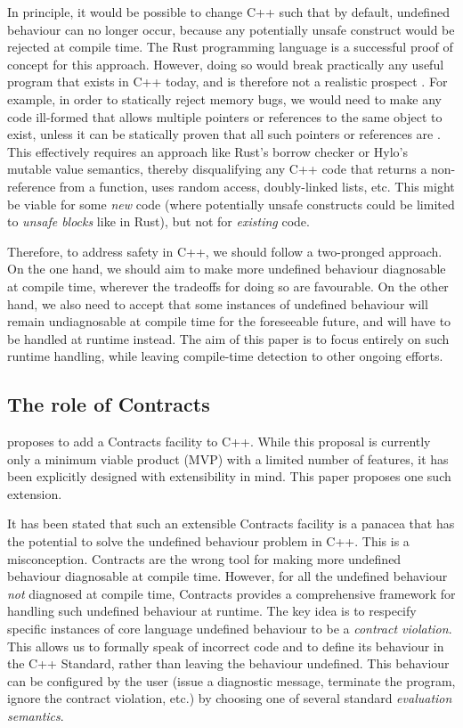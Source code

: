 In principle, it would be possible to change C++ such that by default, undefined behaviour can no longer occur, because any  potentially unsafe construct would be rejected at compile time. The Rust programming language is a successful proof of concept for this approach. However, doing so would break practically any useful program that exists in C++ today, and is therefore not a realistic prospect \cite{Doumler2023}. For example, in order to statically reject memory bugs, we would need to make any code ill-formed that allows multiple pointers or references to the same object to exist, unless it can be statically proven that all such pointers or references are . This effectively requires an approach like Rust's borrow checker or Hylo's mutable value semantics, thereby disqualifying any C++ code that returns a non- reference from a function, uses random access, doubly-linked lists, etc. This might be viable for some \emph{new} code (where potentially unsafe constructs could be limited to \emph{unsafe blocks} like in Rust), but not for \emph{existing} code. 

Therefore, to address safety in C++, we should follow a two-pronged approach. On the one hand, we should aim to make more undefined behaviour diagnosable at compile time, wherever the tradeoffs for doing so are favourable. On the other hand, we also need to accept that some instances of undefined behaviour will remain undiagnosable at compile time for the foreseeable future, and will have to be handled at runtime instead. The aim of this paper is to focus entirely on such runtime handling, while leaving compile-time detection to other ongoing efforts.

\subsection{The role of Contracts}

\cite{P2900R6} proposes to add a Contracts facility to C++. While this proposal is currently only a minimum viable product (MVP) with a limited number of features, it has been explicitly designed with extensibility in mind. This paper proposes one such extension.

It has been stated that such an extensible Contracts facility is a panacea that has the potential to solve the undefined behaviour problem in C++. This is a misconception. Contracts are the wrong tool for making more undefined behaviour diagnosable at compile time. However, for all the undefined behaviour \emph{not} diagnosed at compile time, Contracts provides a comprehensive framework for handling such undefined behaviour at runtime. The key idea is to respecify specific instances of core language undefined behaviour to be a \emph{contract violation}. This allows us to formally speak of incorrect code and to define its behaviour in the C++ Standard, rather than leaving the behaviour undefined. This behaviour can be configured by the user (issue a diagnostic message, terminate the program, ignore the contract violation, etc.) by choosing one of several standard \emph{evaluation semantics}.

